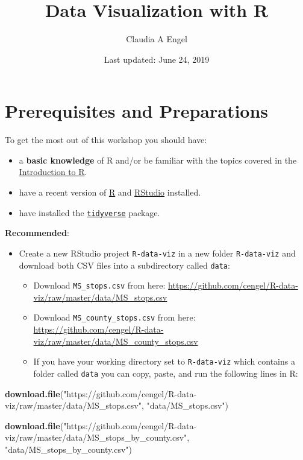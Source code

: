 \documentclass[]{book}
\title{Data Visualization with R}
\author{Claudia A Engel}
\date{Last updated: June 24, 2019}
\newenvironment{Shaded}{\begin{snugshade}}{\end{snugshade}}
\newcommand{\KeywordTok}[1]{\textcolor[rgb]{0.13,0.29,0.53}{\textbf{#1}}}
\newcommand{\NormalTok}[1]{#1}
\newcommand{\StringTok}[1]{\textcolor[rgb]{0.31,0.60,0.02}{#1}}
\providecommand{\tightlist}{%
  \setlength{\itemsep}{0pt}\setlength{\parskip}{0pt}}
\begin{document}
\maketitle

{
\setcounter{tocdepth}{1}
\tableofcontents
}
\hypertarget{prerequisites-and-preparations}{%
\chapter*{Prerequisites and Preparations}\label{prerequisites-and-preparations}}

To get the most out of this workshop you should have:

\begin{itemize}
\tightlist
\item
  a \textbf{basic knowledge} of R and/or be familiar with the topics covered in the \href{https://cengel.github.io/R-intro/}{Introduction to R}.
\item
  have a recent version of \href{https://cran.r-project.org/}{R} and \href{https://www.rstudio.com/}{RStudio} installed.
\item
  have installed the \href{http://tidyverse.org/}{\texttt{tidyverse}} package.
\end{itemize}

\textbf{Recommended}:

\begin{itemize}
\tightlist
\item
  Create a new RStudio project \texttt{R-data-viz} in a new folder \texttt{R-data-viz} and download both CSV files into a subdirectory called \texttt{data}:

  \begin{itemize}
  \tightlist
  \item
    Download \texttt{MS\_stops.csv} from here: \url{https://github.com/cengel/R-data-viz/raw/master/data/MS_stops.csv}
  \item
    Download \texttt{MS\_county\_stops.csv} from here: \url{https://github.com/cengel/R-data-viz/raw/master/data/MS_county_stops.csv}
  \item
    If you have your working directory set to \texttt{R-data-viz} which contains a folder called \texttt{data} you can copy, paste, and run the following lines in R:
  \end{itemize}
\end{itemize}

\begin{Shaded}
\begin{Highlighting}[]
\KeywordTok{download.file}\NormalTok{(}\StringTok{"https://github.com/cengel/R-data-viz/raw/master/data/MS_stops.csv"}\NormalTok{, }
              \StringTok{"data/MS_stops.csv"}\NormalTok{)}

\KeywordTok{download.file}\NormalTok{(}\StringTok{"https://github.com/cengel/R-data-viz/raw/master/data/MS_stops_by_county.csv"}\NormalTok{, }
              \StringTok{"data/MS_stops_by_county.csv"}\NormalTok{)}
\end{Highlighting}
\end{Shaded}
\end{document}

